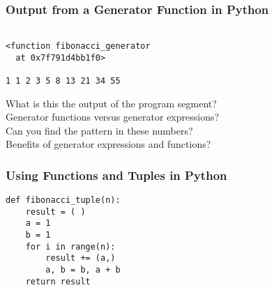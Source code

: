 \documentclass[14pt,aspectratio=169]{beamer}
\begin{document}
%
\begin{frame}[fragile]
  \frametitle{Output from a Generator Function in Python}
  \normalsize
  \begin{minipage}{6in}
    \vspace*{.1in}
    \begin{verbatim}

<function fibonacci_generator
  at 0x7f791d4bb1f0>

1 1 2 3 5 8 13 21 34 55
    \end{verbatim}
  \vspace*{.35in}
  \begin{minipage}{5.2in}
  \begin{center}
    \normalsize \noindent What is this the output of the program segment? \\
    \normalsize \noindent Generator functions versus generator expressions? \\
    \normalsize \noindent Can you find the pattern in these numbers? \\
    \normalsize \noindent Benefits of generator expressions and functions? \\
  \end{center}
  \end{minipage}
  \end{minipage}
\end{frame}

%
\begin{frame}[fragile]
  \frametitle{Using Functions and Tuples in Python}
  \normalsize
  \begin{minipage}{6in}
    \vspace*{.1in}
    \begin{verbatim}
def fibonacci_tuple(n):
    result = ( )
    a = 1
    b = 1
    for i in range(n):
        result += (a,)
        a, b = b, a + b
    return result
    \end{verbatim}
  \end{minipage}
\end{frame}
\end{document}
